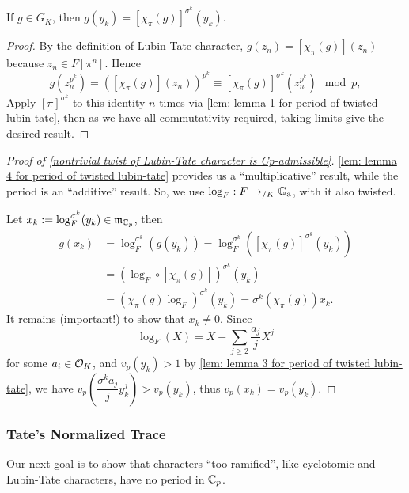 \begin{lemma}\label{lem: lemma 4 for period of twisted lubin-tate}
    If $g\in G_K$, then $\displaystyle g(y_k) = \left[ \chi_\pi(g) \right]^{\sigma^k}(y_k)$.
\end{lemma}

\begin{proof}
    By the definition of Lubin-Tate character,
    $g(z_n) = [\chi_\pi(g)](z_n)$
    because $z_n\in F[\pi^n]$.
    Hence \[g(z_n^{p^k}) = \left( [\chi_\pi(g)](z_n) \right)^{p^k} 
    \equiv
    [\chi_\pi(g)]^{\sigma^k}(z_n^{p^k})\mod p,\]
    Apply $[\pi]^{\sigma^k}$ to this identity $n$-times via \cref{lem: lemma 1 for period of twisted lubin-tate}, then as we have all commutativity required, taking limits give the desired result.
\end{proof}

\begin{proof}
    [Proof of \cref{nontrivial twist of Lubin-Tate character is Cp-admissible}]
    \cref{lem: lemma 4 for period of twisted lubin-tate} provides us a ``multiplicative'' result, while the period is an ``additive'' result. So, we use $\log_F : F\to_{/K} {\mathbb{G}_{\mathrm{a}}}$, with it also twisted.
    
    Let $x_k := \log_F^{\sigma^k}(y_k)\in\mathfrak{m}_{\mathbb{C}_p}$, then\begin{align*}
        g(x_k) &= \log_F^{\sigma^k}(g(y_k))
        = \log_F^{\sigma^k} \left( \left[ \chi_\pi(g) \right]^{\sigma^k}(y_k) \right) \\ &
        = \left( \log_F\circ [\chi_\pi(g)] \right)^{\sigma^k}(y_k) \\ &
        = (\chi_\pi(g)\log_F)^{\sigma^k}(y_k) = \sigma^k(\chi_\pi(g))x_k.
    \end{align*}
    It remains (important!) to show that $x_k\ne 0$.
    Since \[\log_F(X) = X + \sum_{j\ge 2} \frac{a_j}{j}X^j\]for some $a_i\in \mathcal{O}_K$,
    and $v_p(y_k) > 1$ by \cref{lem: lemma 3 for period of twisted lubin-tate},
    we have $v_p\left( \dfrac{\sigma^ka_j}{j}y_k^j \right) > v_p(y_k)$,
    thus $v_p(x_k) = v_p(y_k)$.
\end{proof}

\subsubsection{Tate's Normalized Trace}
Our next goal is to show that characters ``too ramified'', like cyclotomic and Lubin-Tate characters, have no period in $\mathbb{C}_p$.

